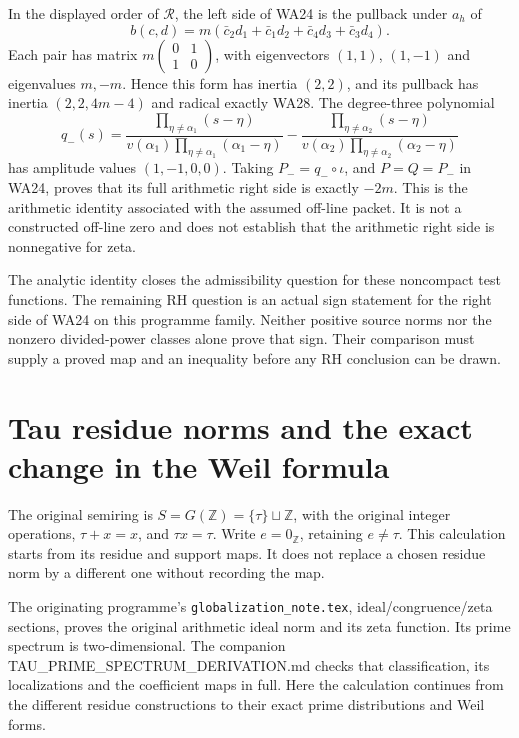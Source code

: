 \documentclass[
  10pt,
  a4paper,
]{article}
\begin{document}
In the displayed order of \(\mathcal R\), the left side of WA24 is the
pullback under \(a_h\) of \[
b(c,d)=m(\bar c_2d_1+\bar c_1d_2+\bar c_4d_3+\bar c_3d_4).
\tag{WA29}
\] Each pair has matrix \(m\begin{pmatrix}0&1\\1&0\end{pmatrix}\), with
eigenvectors \((1,1)\), \((1,-1)\) and eigenvalues \(m,-m\). Hence this
form has inertia \((2,2)\), and its pullback has inertia \((2,2,4m-4)\)
and radical exactly WA28. The degree-three polynomial \[
q_-(s)=\frac{\prod_{\eta\ne\alpha_1}(s-\eta)}
{v(\alpha_1)\prod_{\eta\ne\alpha_1}(\alpha_1-\eta)}
-\frac{\prod_{\eta\ne\alpha_2}(s-\eta)}
{v(\alpha_2)\prod_{\eta\ne\alpha_2}(\alpha_2-\eta)}
\tag{WA30}
\] has amplitude values \((1,-1,0,0)\). Taking \(P_-=q_-\circ\iota\),
and \(P=Q=P_-\) in WA24, proves that its full arithmetic right side is
exactly \(-2m\). This is the arithmetic identity associated with the
assumed off-line packet. It is not a constructed off-line zero and does
not establish that the arithmetic right side is nonnegative for zeta.

The analytic identity closes the admissibility question for these
noncompact test functions. The remaining RH question is an actual sign
statement for the right side of WA24 on this programme family. Neither
positive source norms nor the nonzero divided-power classes alone prove
that sign. Their comparison must supply a proved map and an inequality
before any RH conclusion can be drawn.

\clearpage

\section{Tau residue norms and the exact change in the Weil
formula}\label{tau-residue-norms-and-the-exact-change-in-the-weil-formula}

The original semiring is \(S=G(\mathbb Z)=\{\tau\}\sqcup\mathbb Z\),
with the original integer operations, \(\tau+x=x\), and \(\tau x=\tau\).
Write \(e=0_{\mathbb Z}\), retaining \(e\ne\tau\). This calculation
starts from its residue and support maps. It does not replace a chosen
residue norm by a different one without recording the map.

The originating programme's \texttt{globalization\_\allowbreak{}note.\allowbreak{}tex},
ideal/congruence/zeta sections, proves the original arithmetic ideal
norm and its zeta function. Its prime spectrum is two-dimensional. The
companion TAU\_PRIME\_SPECTRUM\_DERIVATION.md checks that
classification, its localizations and the coefficient maps in full. Here
the calculation continues from the different residue constructions to
their exact prime distributions and Weil forms.
\end{document}
